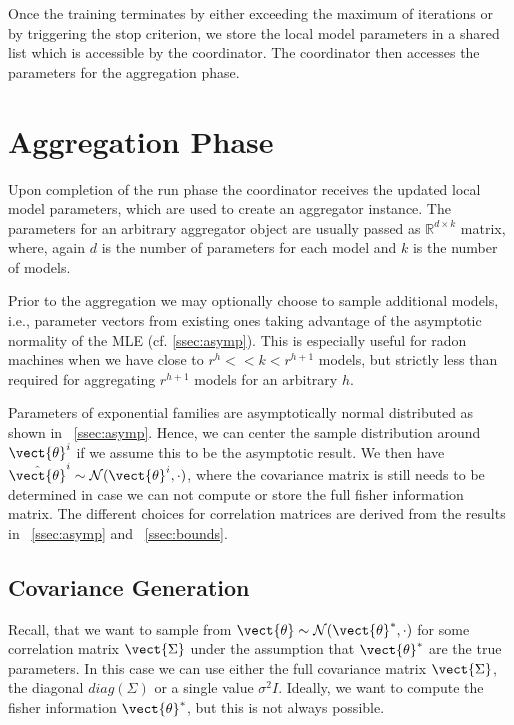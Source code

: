 Once the training terminates by either exceeding the maximum of iterations or by triggering the stop criterion, we store the local model parameters in a shared list which is accessible by the coordinator. 
The coordinator then accesses the parameters for the aggregation phase.


\section{Aggregation Phase}
Upon completion of the run phase the coordinator receives the updated local model parameters, which are used to create an aggregator instance.
The parameters for an arbitrary aggregator object are usually passed as $\mathbb{R}^{d \times k}$ matrix, where, again $d$ is the number of parameters for each model and $k$ is the number of models.


Prior to the aggregation we may optionally choose to sample additional models, i.e., parameter vectors from existing ones taking advantage of the asymptotic normality of the MLE (cf. \ref{ssec:asymp}).
This is especially useful for radon machines when we have close to $ r^h << k < r^{h+1}$ models, but strictly less than required for aggregating $r^{h+1}$ models for an arbitrary $h$.

Parameters of exponential families are asymptotically normal distributed as shown in \sect~\ref{ssec:asymp}.
Hence, we can center the sample distribution around $\vect{\theta}^i$ if we assume this to be the asymptotic result.
We then have $\hat{\vect{\theta}}^i \sim \mathcal{N}(\vect{\theta}^i, \cdot)$, where the covariance matrix is still needs to be determined in case we can not compute or store the full fisher information matrix.
The different choices for correlation matrices are derived from the results in \sect~\ref{ssec:asymp} and \sect~\ref{ssec:bounds}.

\subsection{Covariance Generation}
\label{ssec:covgen}

Recall, that we want to sample from $\vect{\theta} \sim \mathcal{N}(\vect{\theta}^*, \cdot)$ for some correlation matrix $\vect{\Sigma}$ under the assumption that $\vect{\theta}^*$ are the true parameters.
In this case we can use either the full covariance matrix $\vect{\Sigma}$, the diagonal $diag(\Sigma)$ or a single value $\sigma^2 I$.
Ideally, we want to compute the fisher information \wrt $\vect{\theta}^*$, but this is not always possible.

